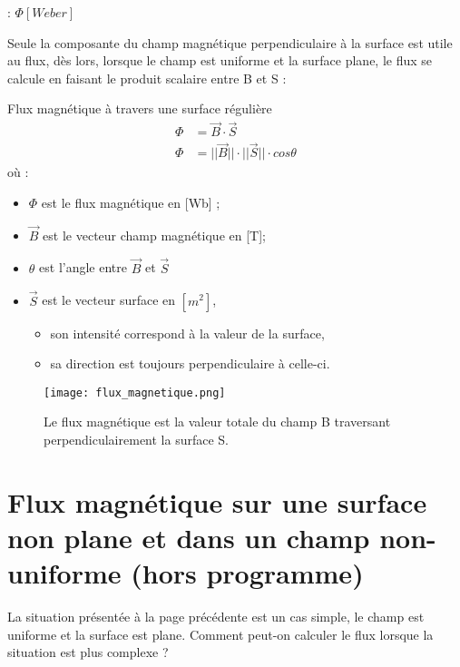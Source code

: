 \begin{encadre}
     : \(\Phi [Weber]\)
\end{encadre}

Seule la composante du champ magnétique perpendiculaire à la surface est utile au flux, dès lors, lorsque le champ est uniforme et la surface plane, le flux se calcule en faisant le produit scalaire entre B et S :

\begin{encadre_equation*}{Flux magnétique à travers une surface régulière}
    \begin{equation}
        \begin{split}
            \Phi & = \vec{B} \cdot \vec{S} \\
            \Phi & = ||\vec{B}|| \cdot ||\vec{S}|| \cdot cos \theta
        \end{split}
    \end{equation} où :
    \begin{itemize}[label=\textbullet]
        \item \( \Phi \)  est le flux magnétique en [Wb] ;
        \item \( \vec{B} \) est le vecteur champ magnétique en [T];
        \item \( \theta\) est l'angle entre \( \vec{B} \) et \( \vec{S} \)
        \item \( \vec{S} \) est le vecteur surface en \([m^2]\),
              \begin{itemize}
                  \item son intensité correspond à la valeur de la surface,
                  \item sa direction est toujours perpendiculaire à celle-ci.
              \end{itemize}
    \end{itemize}
\end{encadre_equation*}

\begin{figure}[ht]
    \centering
    \texttt{[image: flux\_magnetique.png]}
    \caption{Le flux magnétique est la valeur totale du champ B traversant perpendiculairement la surface S.}
    \label{flux_magnetique}
\end{figure}

\newpage

\section{Flux magnétique sur une surface non plane et dans un champ non-uniforme (hors programme)}
La situation présentée à la page précédente est un cas simple, le champ est uniforme et la surface est plane. Comment peut-on calculer le flux lorsque la situation est plus complexe ?

